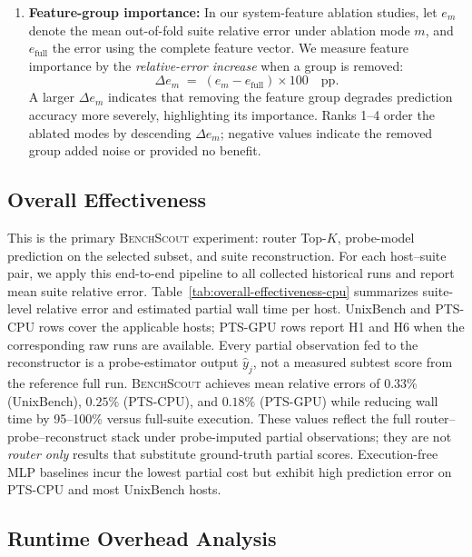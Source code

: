 \documentclass[sigplan,10pt]{acmart}
\newcommand{\ourmethod}{\textsc{BenchScout}\xspace}
\newcommand{\ptscpu}{PTS-CPU}
\newcommand{\ptsgpu}{PTS-GPU}
\begin{document}
\begin{enumerate}
    \item \textbf{Feature-group importance:} In our system-feature ablation studies, let \(e_m\) denote the mean out-of-fold suite relative error under ablation mode \(m\), and \(e_{\mathrm{full}}\) the error using the complete feature vector. We measure feature importance by the \emph{relative-error increase} when a group is removed:
    \begin{equation}
    \label{eq:xi-importance}
    \Delta e_m \;=\; (e_m - e_{\mathrm{full}}) \times 100 \quad \mathrm{pp}.
    \end{equation}
    A larger \(\Delta e_m\) indicates that removing the feature group degrades prediction accuracy more severely, highlighting its importance. Ranks 1--4 order the ablated modes by descending \(\Delta e_m\); negative values indicate the removed group added noise or provided no benefit.
\end{enumerate}

\subsection{Overall Effectiveness}
\label{subsec:overall-effectiveness}

This is the primary \ourmethod{} experiment: router Top-$K$, probe-model prediction on the selected subset, and suite reconstruction.
For each host--suite pair, we apply this end-to-end pipeline to all collected historical runs and report mean suite relative error.
Table~\ref{tab:overall-effectiveness-cpu} summarizes suite-level relative error and estimated partial wall time per host.
UnixBench and \ptscpu{} rows cover the applicable hosts; \ptsgpu{} rows report H1 and H6 when the corresponding raw runs are available.
Every partial observation fed to the reconstructor is a probe-estimator output $\hat{y}_j$, not a measured subtest score from the reference full run.
\ourmethod achieves mean relative errors of $0.33\%$ (UnixBench), $0.25\%$ (\ptscpu), and $0.18\%$ (\ptsgpu) while reducing wall time by 95--100\% versus full-suite execution.
These values reflect the full router--probe--reconstruct stack under probe-imputed partial observations; they are not \emph{router only} results that substitute ground-truth partial scores.
Execution-free MLP baselines incur the lowest partial cost but exhibit high prediction error on \ptscpu{} and most UnixBench hosts.

\subsection{Runtime Overhead Analysis}
\label{subsec:resource-waveforms}
\end{document}
